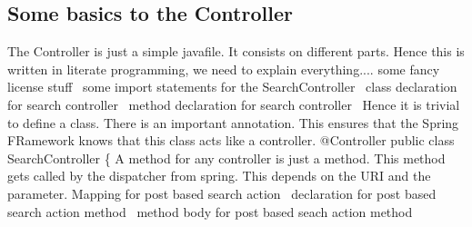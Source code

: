 \documentclass{llncs}%
\begin{document}
\subsection{Some basics to the Controller}
The Controller is just a simple javafile. It consists on different parts. Hence this is written in literate programming, we need to explain everything....
\endmoddef\nwstartdeflinemarkup\nwenddeflinemarkup
\LA{}some fancy license stuff~{\nwtagstyle{}}\RA{}
\LA{}some import statements for the SearchController~{\nwtagstyle{}}\RA{}
\LA{}class declaration for search controller~{\nwtagstyle{}}\RA{}
        \LA{}method declaration for search controller~{\nwtagstyle{}}\RA{}
\nwendcode{}\nwdocspar
Hence it is trivial to define a class. There is an important annotation. This ensures that the Spring FRamework knows that this class acts like a controller.
\nwenddocs{}\endmoddef\nwstartdeflinemarkup{}\nwenddeflinemarkup
@Controller
public class SearchController \{
\nwendcode{}\nwdocspar
A method for any controller is just a method. This method gets called by the dispatcher from spring. This depends on the URI and the parameter.
\nwenddocs{}\endmoddef\nwstartdeflinemarkup{}\nwenddeflinemarkup
\LA{}Mapping for post based search action~{\nwtagstyle{}}\RA{}
\LA{}declaration for post based search action method~{\nwtagstyle{}}\RA{}
        \LA{}method body for post based seach action method~{\nwtagstyle{}}\RA{}
        
\nwendcode{}\nwdocspar
\end{document}
